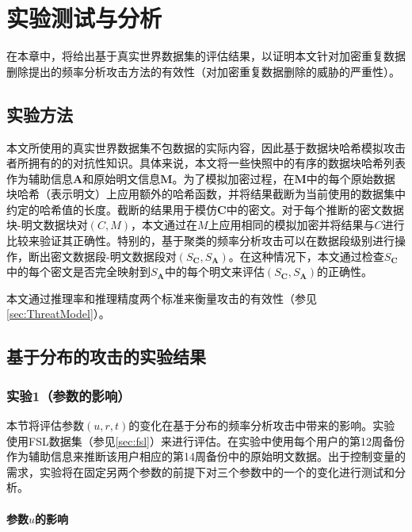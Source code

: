 \chapter{实验测试与分析}
\label{sec:Experiment}

在本章中，将给出基于真实世界数据集的评估结果，以证明本文针对加密重复数据删除提出的频率分析攻击方法的有效性（对加密重复数据删除的威胁的严重性）。

\section{实验方法}
\label{sec:dataset}

本文所使用的真实世界数据集不包数据的实际内容，因此基于数据块哈希模拟攻击者所拥有的的对抗性知识。具体来说，本文将一些快照中的有序的数据块哈希列表作为辅助信息$\mathbf{A}$和原始明文信息$\mathbf{M}$。为了模拟加密过程，在$\mathbf{M}$中的每个原始数据块哈希（表示明文）上应用额外的哈希函数，并将结果截断为当前使用的数据集中约定的哈希值的长度。截断的结果用于模仿$\mathbf{C}$中的密文。对于每个推断的密文数据块-明文数据块对$(C,M)$，本文通过在$M$上应用相同的模拟加密并将结果与​​$C$进行比较来验证其正确性。特别的，基于聚类的频率分析攻击可以在数据段级别进行操作，断出密文数据段-明文数据段对$(S_\mathbf{C},S_\mathbf {A})$。在这种情况下，本文通过检查$S_\mathbf{C}$中的每个密文是否完全映射到$S_\mathbf{A}$中的每个明文来评估$(S_\mathbf {C},S_\mathbf{A})$的正确性。

本文通过推理率和推理精度两个标准来衡量攻击的有效性（参见\ref{sec:ThreatModel}）。


\section{基于分布的攻击的实验结果}
\label{sec:experiment-distribution}

\subsection{实验1（参数的影响）}


本节将评估参数$(u, r, t)$的变化在基于分布的频率分析攻击中带来的影响。实验使用FSL数据集（参见\ref{sec:fsl}）来进行评估。在实验中使用每个用户的第12周备份作为辅助信息来推断该用户相应的第14周备份中的原始明文数据。出于控制变量的需求，实验将在固定另两个参数的前提下对三个参数中的一个的变化进行测试和分析。


\subsubsection{参数$u$的影响}

